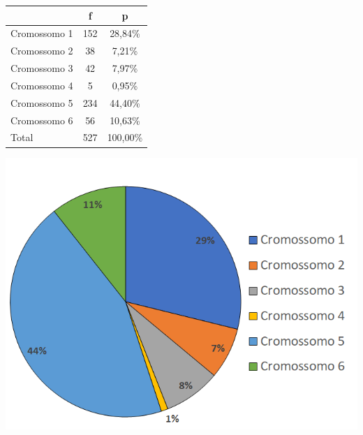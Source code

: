 \begin{description}
\begin{table}[h!]
	\begin{minipage}[b]{.49\textwidth}
	\centering
			\begin{tabular}{l|c|c}
				& f   & p        \\ \hline
				Cromossomo 1 & 152 & 28,84\%  \\
				Cromossomo 2 & 38  & 7,21\%  \\
				Cromossomo 3 & 42  & 7,97\%  \\
				Cromossomo 4 & 5   & 0,95\%   \\
				Cromossomo 5 & 234 & 44,40\%   \\
				Cromossomo 6 & 56  & 10,63\%   \\ \hline
				Total        & 527 & 100,00\%
			\end{tabular}
			\label{tab:exemplo_roleta}
	\end{minipage}
	\begin{minipage}[b]{.49\textwidth}
	\centering
			\includegraphics[width=\linewidth]{imagens/exemplo_roleta.png}
			\label{fig:exemplo_roleta}
	\end{minipage}
\end{table}


\end{description}

